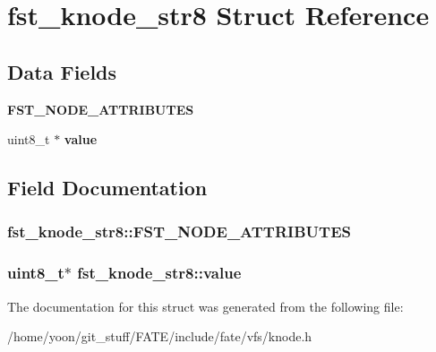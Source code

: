 \hypertarget{structfst__knode__str8}{\section{fst\-\_\-knode\-\_\-str8 Struct Reference}
\label{structfst__knode__str8}
}
\subsection*{Data Fields}
\begin{DoxyCompactItemize}
\item 
\hypertarget{structfst__knode__str8_a52358ee227ecd0171aae737a79ee76ee}{{\bfseries F\-S\-T\-\_\-\-N\-O\-D\-E\-\_\-\-A\-T\-T\-R\-I\-B\-U\-T\-E\-S}}\label{structfst__knode__str8_a52358ee227ecd0171aae737a79ee76ee}

\item 
\hypertarget{structfst__knode__str8_ae089713d23fc78babefc610bc1cb455d}{uint8\-\_\-t $\ast$ {\bfseries value}}\label{structfst__knode__str8_ae089713d23fc78babefc610bc1cb455d}

\end{DoxyCompactItemize}


\subsection{Field Documentation}
\hypertarget{structfst__knode__str8_a52358ee227ecd0171aae737a79ee76ee}{
\subsubsection[{F\-S\-T\-\_\-\-N\-O\-D\-E\-\_\-\-A\-T\-T\-R\-I\-B\-U\-T\-E\-S}]{\setlength{\rightskip}{0pt plus 5cm}fst\-\_\-knode\-\_\-str8\-::\-F\-S\-T\-\_\-\-N\-O\-D\-E\-\_\-\-A\-T\-T\-R\-I\-B\-U\-T\-E\-S}}\label{structfst__knode__str8_a52358ee227ecd0171aae737a79ee76ee}
\hypertarget{structfst__knode__str8_ae089713d23fc78babefc610bc1cb455d}{
\subsubsection[{value}]{\setlength{\rightskip}{0pt plus 5cm}uint8\-\_\-t$\ast$ fst\-\_\-knode\-\_\-str8\-::value}}\label{structfst__knode__str8_ae089713d23fc78babefc610bc1cb455d}


The documentation for this struct was generated from the following file\-:\begin{DoxyCompactItemize}
\item 
/home/yoon/git\-\_\-stuff/\-F\-A\-T\-E/include/fate/vfs/knode.\-h\end{DoxyCompactItemize}
